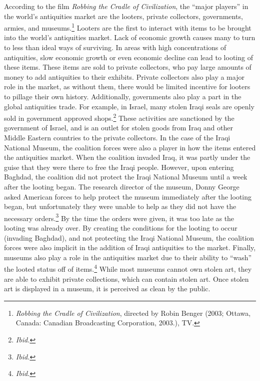 \documentclass[11pt]{article}
\begin{document}
According to the film \textit{Robbing the Cradle of Civilization}, the ``major players'' in the world's antiquities market are the looters, private collectors, governments, armies, and museums.\footnote{\textit{Robbing the Cradle of Civilization}, directed by Robin Benger (2003; Ottawa, Canada: Canadian Broadcasting Corporation, 2003.), TV.} Looters are the first to interact with items to be brought into the world's antiquities market. Lack of economic growth causes many to turn to less than ideal ways of surviving. In areas with high concentrations of antiquities, slow economic growth or even economic decline can lead to looting of these items. These items are sold to private collectors, who pay large amounts of money to add antiquities to their exhibits. Private collectors also play a major role in the market, as without them, there would be limited incentive for looters to pillage their own history. Additionally, governments also play a part in the global antiquities trade. For example, in Israel, many stolen Iraqi seals are openly sold in government approved shops.\footnote{\textit{Ibid.}} These activities are sanctioned by the government of Israel, and is an outlet for stolen goods from Iraq and other Middle Eastern countries to the private collectors. In the case of the Iraqi National Museum, the coalition forces were also a player in how the items entered the antiquities market. When the coalition invaded Iraq, it was partly under the guise that they were there to free the Iraqi people. However, upon entering Baghdad, the coalition did not protect the Iraqi National Museum until a week after the looting began. The research director of the museum, Donny George asked American forces to help protect the museum immediately after the looting began, but unfortunately they were unable to help as they did not have the necessary orders.\footnote{\textit{Ibid.}} By the time the orders were given, it was too late as the looting was already over. By creating the conditions for the looting to occur (invading Baghdad), and not protecting the Iraqi National Museum, the coalition forces were also implicit in the addition of Iraqi antiquities to the market. Finally, museums also play a role in the antiquities market due to their ability to ``wash'' the looted status off of items.\footnote{\textit{Ibid.}} While most museums cannot own stolen art, they are able to exhibit private collections, which can contain stolen art. Once stolen art is displayed in a museum, it is perceived as clean by the public.
\end{document}
